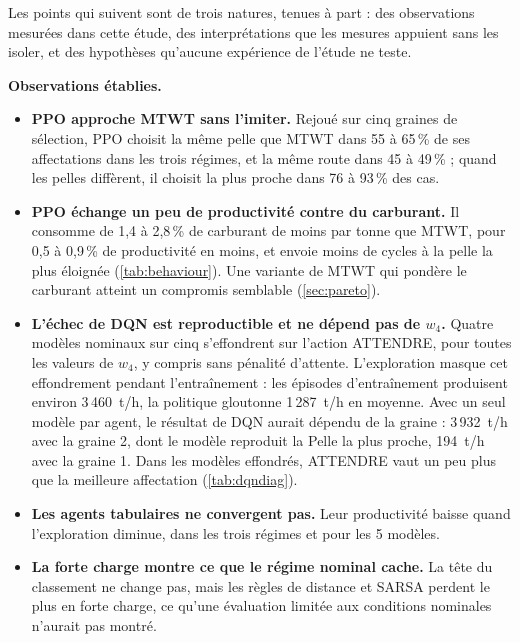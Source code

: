 \documentclass[11pt,a4paper]{article}
\newif\ifcorrmarks
\newenvironment{corrbloc}{\par\ifcorrmarks\color{corrcolor}\fi}{\par}
\begin{document}
\begin{corrbloc}
Les points qui suivent sont de trois natures, tenues à part : des observations mesurées dans cette étude, des interprétations que les mesures appuient sans les isoler, et des hypothèses qu'aucune expérience de l'étude ne teste.

\textbf{Observations établies.}
\begin{itemize}
  \item \textbf{PPO approche MTWT sans l'imiter.} Rejoué sur cinq graines de sélection, PPO choisit la même pelle que MTWT dans 55 à 65\,\% de ses affectations dans les trois régimes, et la même route dans 45 à 49\,\% ; quand les pelles diffèrent, il choisit la plus proche dans 76 à 93\,\% des cas.
  \item \textbf{PPO échange un peu de productivité contre du carburant.} Il consomme de 1,4 à 2,8\,\% de carburant de moins par tonne que MTWT, pour 0,5 à 0,9\,\% de productivité en moins, et envoie moins de cycles à la pelle la plus éloignée (\cref{tab:behaviour}). Une variante de MTWT qui pondère le carburant atteint un compromis semblable (\cref{sec:pareto}).
  \item \textbf{L'échec de DQN est reproductible et ne dépend pas de $w_4$.} Quatre modèles nominaux sur cinq s'effondrent sur l'action ATTENDRE, pour toutes les valeurs de $w_4$, y compris sans pénalité d'attente. L'exploration masque cet effondrement pendant l'entraînement : les épisodes d'entraînement produisent environ 3\,460~t/h, la politique gloutonne 1\,287~t/h en moyenne. Avec un seul modèle par agent, le résultat de DQN aurait dépendu de la graine : 3\,932~t/h avec la graine 2, dont le modèle reproduit la Pelle la plus proche, 194~t/h avec la graine 1. Dans les modèles effondrés, ATTENDRE vaut un peu plus que la meilleure affectation (\cref{tab:dqndiag}).
  \item \textbf{Les agents tabulaires ne convergent pas.} Leur productivité baisse quand l'exploration diminue, dans les trois régimes et pour les 5 modèles.
  \item \textbf{La forte charge montre ce que le régime nominal cache.} La tête du classement ne change pas, mais les règles de distance et SARSA perdent le plus en forte charge, ce qu'une évaluation limitée aux conditions nominales n'aurait pas montré.
\end{itemize}


\end{corrbloc}
\end{document}
